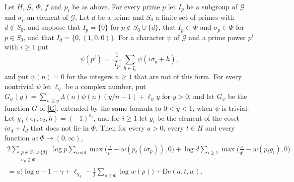 \begin{proposition}\label{excess}
Let $H$, $\mathcal G$, $\Phi$, $f$ and $p_t$ be as above. For every prime $p$ let $I_p$ be a subgroup of $\mathcal G$ and $\sigma_p$ an element of $\mathcal G$. Let $d$ be a prime and $S_0$ a finite set of primes with $d\notin S_0$, and suppose that $I_p=\{0\}$ for $p\notin S_0\cup\{d\}$, that $I_p\subset\Phi$ and $\sigma_p\in\Phi$ for $p\in S_0$, and that $I_d=\{0,(1,0,0)\}$. For a character $\psi$ of $\mathcal G$ and a prime power $p^i$ with $i\ge1$ put
\[
\psi(p^i)=\frac1{\lvert I_p\rvert}\sum_{h\in I_p}\psi(i\sigma_p+h),
\]
and put $\psi(n)=0$ for the integers $n\ge1$ that are not of this form. For every nontrivial $\psi$ let $\ell_\psi$ be a complex number, put $G_\psi(y)=\sum_{n\le y}\Lambda(n)\psi(n)(y/n-1)+\ell_\psi y$ for $y>0$, and let $G_\psi$ be the function $G$ of \eqref{G}, extended by the same formula to $0<y<1$, when $\psi$ is trivial. Let $\chi_1(e_1,e_2,h)=(-1)^{e_1}$, and for $i\ge1$ let $g_i$ be the element of the coset $i\sigma_d+I_d$ that does not lie in $\Phi$. Then for every $a>0$, every $t\in H$ and every function $w\colon\Phi\to(0,\infty)$,
\begin{multline}\label{excessid}
2\sum_{\substack{p\notin S_0\cup\{d\}\\ \sigma_p\notin\Phi}}\log p\sum_{i\ \mathrm{odd}}\max\Big(\frac a{p^i}-w(p_t(i\sigma_p)),0\Big)+\log d\sum_{i\ge1}\max\Big(\frac a{d^i}-w(p_tg_i),0\Big)\\
=a\Big(\log a-1-\gamma+\ell_{\chi_1}-\frac1f\sum_{\rho\in\Phi}\log w(\rho)\Big)+\mathrm{De}(a,t,w).
\end{multline}
\end{proposition}

